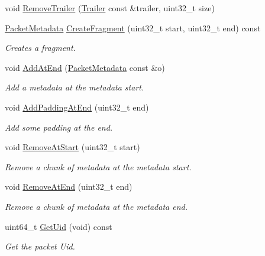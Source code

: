 \begin{DoxyCompactItemize}
\item 
void \hyperlink{classns3_1_1PacketMetadata_a2eaa46d9f7c88a5aef121521b196753c}{Remove\+Trailer} (\hyperlink{classns3_1_1Trailer}{Trailer} const \&trailer, uint32\+\_\+t size)
\item 
\hyperlink{classns3_1_1PacketMetadata}{Packet\+Metadata} \hyperlink{classns3_1_1PacketMetadata_a0c4fe43ab63b49432451c37263826d67}{Create\+Fragment} (uint32\+\_\+t start, uint32\+\_\+t end) const 
\begin{DoxyCompactList}\small\item\em Creates a fragment. \end{DoxyCompactList}\item 
void \hyperlink{classns3_1_1PacketMetadata_af7ceb1a4a7ded625c85dbd477b5fc8b6}{Add\+At\+End} (\hyperlink{classns3_1_1PacketMetadata}{Packet\+Metadata} const \&o)
\begin{DoxyCompactList}\small\item\em Add a metadata at the metadata start. \end{DoxyCompactList}\item 
void \hyperlink{classns3_1_1PacketMetadata_a9398445226b4df97e2d489cf0a431ace}{Add\+Padding\+At\+End} (uint32\+\_\+t end)
\begin{DoxyCompactList}\small\item\em Add some padding at the end. \end{DoxyCompactList}\item 
void \hyperlink{classns3_1_1PacketMetadata_a9a0300e7ae709f269d59b6733e590d56}{Remove\+At\+Start} (uint32\+\_\+t start)
\begin{DoxyCompactList}\small\item\em Remove a chunk of metadata at the metadata start. \end{DoxyCompactList}\item 
void \hyperlink{classns3_1_1PacketMetadata_a7c76154f5302bd55a68406f0103d50c6}{Remove\+At\+End} (uint32\+\_\+t end)
\begin{DoxyCompactList}\small\item\em Remove a chunk of metadata at the metadata end. \end{DoxyCompactList}\item 
uint64\+\_\+t \hyperlink{classns3_1_1PacketMetadata_a08284bf2d5d0690d16a2eee813122ede}{Get\+Uid} (void) const 
\begin{DoxyCompactList}\small\item\em Get the packet Uid. \end{DoxyCompactList}\item 

\end{DoxyCompactItemize}
